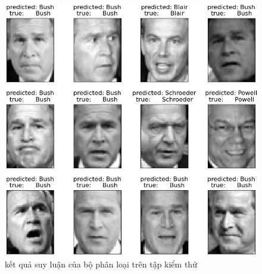 \documentclass[14pt,oneside,a4paper]{report}
\numberwithin{equation}{section}
\begin{document}
\begin{figure}[htp]
\centering
\includegraphics[scale=0.8]{predict_pca.png}
\caption{kết quả suy luận của bộ phân loại trên tập kiểm thử}
\label{fig:output}
\end{figure}
\end{document}
